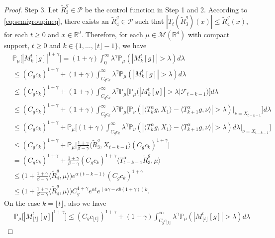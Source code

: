 \documentclass[12pt, a4paper]{amsart}
\theoremstyle{definition}
\numberwithin{equation}{section}
\begin{document}
\begin{proof}
    Step 3.
    Let $\tilde R^g_3\in \mathcal P$ be the control function in Step 1 and 2. According to \eqref{eq:semigroupineq}, there exists an $\tilde R^g_4\in \mathcal P$ such that
$
    |T_t(\tilde R^g_3)(x)|
    \leq \tilde R^g_4(x),
$
    for each $t\geq 0$ and $x\in \mathbb{R}^d$.
    Therefore, for each $\mu \in \mathcal M(\mathbb R^d)$ with compact support, $t\geq 0$ and $k \in \{1,\dots,\lfloor t \rfloor-1\}$, we have
\begin{align}
    &\mathbb P_\mu\big[|M_k^t[g]|^{1+\gamma}\big] = (1+\gamma)\int_0^\infty \lambda^{\gamma} \mathbb P_{\mu}(|M_k^t[g]|>\lambda) d\lambda
    \\&\leq (C_g c_k)^{1+\gamma}+(1+\gamma)\int_{C_g c_k}^\infty \lambda^{\gamma}\mathbb P_\mu(|M_k^t[g]|> \lambda) d\lambda
    \\&\leq (C_g c_k)^{1+\gamma}+(1+\gamma)\int_{C_g c_k}^\infty \lambda^{\gamma}\mathbb P_\mu \big[\mathbb P_\mu\big(|M_k^t[g]|> \lambda\big| \mathscr F_{t-k-1}\big)\big] d\lambda
    \\&\leq (C_g c_k)^{1+\gamma}+(1+\gamma)\int_{C_g c_k}^\infty \lambda^{\gamma}\mathbb P_\mu \big[\mathbb P_\nu(|\langle T_k^\alpha g,X_1\rangle - \langle T_{k+1}^\alpha g, \nu\rangle|> \lambda)\big|_{\nu=X_{t-k-1}}\big] d\lambda
    \\&\leq (C_g c_k)^{1+\gamma}+\mathbb P_\mu\Big[(1+\gamma)\int_{C_g c_k}^\infty \lambda^{\gamma} \mathbb P_\nu(|\langle T_k^\alpha g,X_1\rangle - \langle T_{k+1}^\alpha g, \nu\rangle|> \lambda) d\lambda\Big|_{\nu=X_{t-k-1}}\Big]
    \\&\leq (C_g c_k)^{1+\gamma}+\mathbb P_\mu\Big[\frac{1+\gamma}{\beta- \gamma}\langle \tilde R^g_3,X_{t-k-1}\rangle (C_g c_k)^{1+\gamma}\Big]
    \\&= (C_g c_k)^{1+\gamma}+\frac{1+\gamma}{\beta- \gamma}(C_g c_k)^{1+\gamma} \langle T_{t-k-1}^{\alpha}\tilde R^g_3,\mu\rangle
    \\&\leq \Big(1+ \frac{1+\gamma}{\beta - \gamma} \langle \tilde R^g_4,\mu\rangle\Big) e^{\alpha(t-k-1)}(C_g c_k)^{1+\gamma}
    \\&\leq \Big(1+ \frac{1+\gamma}{\beta - \gamma} \langle \tilde R^g_4,\mu\rangle\Big) C_g^{1+\gamma}e^{\alpha t}e^{(\alpha \gamma - \kappa b(1+\gamma))k}.
\end{align}
On the case $k=\lfloor t \rfloor$, also we have
\begin{align}
     &\mathbb P_\mu\big[|M_{\lfloor t \rfloor}^t[g]|^{1+\gamma}\big]\leq (C_g c_{\lfloor t \rfloor})^{1+\gamma}+(1+\gamma)\int_{C_g c_{\lfloor t \rfloor}}^\infty \lambda^{\gamma}\mathbb P_\mu(|M_{\lfloor t \rfloor}^t[g]|> \lambda) d\lambda

\end{align}
\end{proof}
\end{document}
